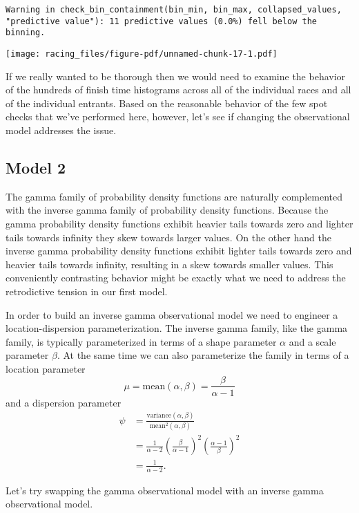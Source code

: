 \documentclass[
  letterpaper,
  DIV=11,
  numbers=noendperiod]{scrartcl}
\begin{document}
\begin{verbatim}
Warning in check_bin_containment(bin_min, bin_max, collapsed_values,
"predictive value"): 11 predictive values (0.0%) fell below the binning.
\end{verbatim}

\texttt{[image: racing\_files/figure-pdf/unnamed-chunk-17-1.pdf]}

If we really wanted to be thorough then we would need to examine the
behavior of the hundreds of finish time histograms across all of the
individual races and all of the individual entrants. Based on the
reasonable behavior of the few spot checks that we've performed here,
however, let's see if changing the observational model addresses the
issue.

\subsection{Model 2}\label{model-2}

The gamma family of probability density functions are naturally
complemented with the inverse gamma family of probability density
functions. Because the gamma probability density functions exhibit
heavier tails towards zero and lighter tails towards infinity they skew
towards larger values. On the other hand the inverse gamma probability
density functions exhibit lighter tails towards zero and heavier tails
towards infinity, resulting in a skew towards smaller values. This
conveniently contrasting behavior might be exactly what we need to
address the retrodictive tension in our first model.

In order to build an inverse gamma observational model we need to
engineer a location-dispersion parameterization. The inverse gamma
family, like the gamma family, is typically parameterized in terms of a
shape parameter \(\alpha\) and a scale parameter \(\beta\). At the same
time we can also parameterize the family in terms of a location
parameter \[
\mu = \text{mean}(\alpha, \beta) = \frac{\beta}{\alpha - 1}
\] and a dispersion parameter \begin{align*}
\psi
&=
\frac{ \text{variance}(\alpha, \beta) }{ \text{mean}^{2}(\alpha, \beta) }
\\
&=
\frac{1}{\alpha - 2} \left( \frac{ \beta }{ \alpha - 1} \right)^{2}
\left( \frac{ \alpha - 1 }{ \beta } \right)^{2}
\\
&=
\frac{1}{\alpha - 2}.
\end{align*}

Let's try swapping the gamma observational model with an inverse gamma
observational model.
\end{document}
